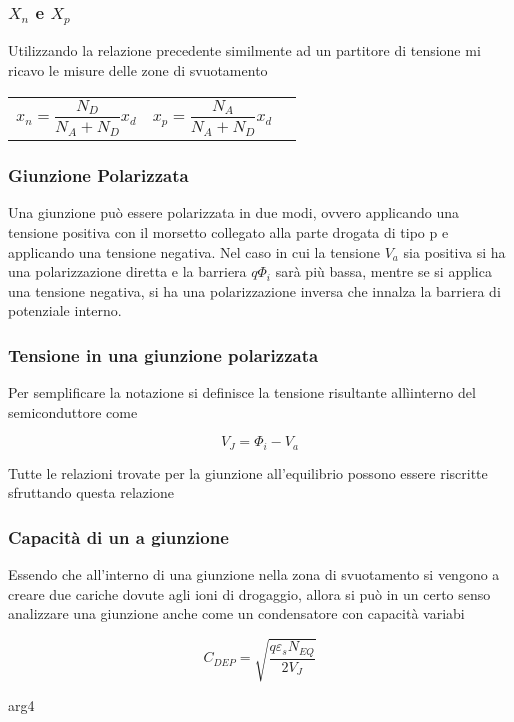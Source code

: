 \documentclass[12pt,a4paper]{article}
\makeatletter
\newcommand{\eqlist}[4]{ 
	\subsubsection*{#1}
	\parbox{19cm}{#2}
	
	\begin{equation}
	#3
	\end{equation}
	\noindent\parbox{19cm}{#4}}
\newcommand{\deqlist}[5]{
	\subsubsection*{#1}
	
	\parbox{19cm}{#2}
	
	\noindent\begin{tabularx}{\textwidth}{@{}XXX@{}}
	\begin{equation}
	#3
	\end{equation}  & 
	\begin{equation}
	#4
	\end{equation}
	
	\end{tabularx}
	
	\noindent\parbox{19cm}{#5}}
\makeatother
\begin{document}
		\deqlist{$ X_{n} $ e $ X_{p} $ }
		{Utilizzando la relazione precedente similmente ad un partitore di tensione mi ricavo le misure delle zone di svuotamento }
		{x_{n} = \frac{N_{D}}{N_{A} + N_{D}} x_{d}}
		{x_{p} = \frac{N_{A}}{N_{A} + N_{D}} x_{d}}
		{}
		
		\subsubsection{Giunzione Polarizzata}
		Una giunzione può essere polarizzata in due modi, ovvero applicando una tensione positiva con il morsetto collegato alla parte drogata di tipo p e applicando una tensione negativa.
		Nel caso in cui la tensione $ V_{a} $ sia positiva si ha una polarizzazione diretta e la barriera $ q\Phi_{i} $ sarà più bassa, mentre se si applica una tensione negativa, si ha una polarizzazione inversa che innalza la barriera di potenziale interno.
		
		\eqlist{Tensione in una giunzione polarizzata}
		{Per semplificare la notazione si definisce la tensione risultante allìinterno del semiconduttore come}
		{V_{J} =\Phi_{i} -V_{a}}
		{Tutte le relazioni trovate per la giunzione all'equilibrio possono essere riscritte sfruttando questa relazione}
		
		\eqlist{Capacità di un a giunzione}
		{Essendo che all'interno di una giunzione nella zona di svuotamento si vengono a creare due cariche dovute agli ioni di drogaggio, allora si può in un certo senso analizzare una giunzione anche come un condensatore con capacità variabi}
		{C_{DEP} = \sqrt{\frac{q \varepsilon_{s} N_{EQ}}{2 V_{J}}}}
		{arg4}
		
\end{document}
